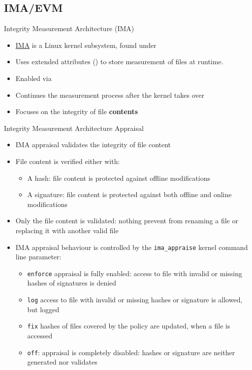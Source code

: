 \subsection{IMA/EVM}

\begin{frame}{Integrity Measurement Architecture (IMA)}
  \begin{itemize}
    \item \href{https://ima-doc.readthedocs.io/en/latest/index.html}{IMA} is a Linux
          kernel subsystem, found under 
    \item Uses extended attributes () to store
          measurement of files at runtime.
    \item Enabled via 
    \item Continues the measurement process after the kernel takes over
    \item Focuses on the integrity of file \textbf{contents}
  \end{itemize}
\end{frame}

\begin{frame}{Integrity Measurement Architecture Appraisal}
  \begin{itemize}
    \item IMA appraisal validates the integrity of file content
    \item File content is verified either with:
      \begin{itemize}
        \item A hash: file content is protected against offline modifications
        \item A signature: file content is protected against both offline and
          online modifications
      \end{itemize}
    \item Only the file content is validated: nothing prevent from renaming
      a file or replacing it with another valid file
    \item IMA appraisal behaviour is controlled by the \texttt{ima\_appraise}
      kernel command line parameter:
      \begin{itemize}
        \item \texttt{enforce} appraisal is fully enabled: access to file with
          invalid or missing hashes of signatures is denied
        \item \texttt{log} access to file with invalid or missing hashes or
          signature is allowed, but logged
        \item \texttt{fix} hashes of files covered by the policy are updated,
          when a file is accessed
        \item \texttt{off}: appraisal is completely disabled: hashes or signature
          are neither generated nor validates
      \end{itemize}
  \end{itemize}
\end{frame}

